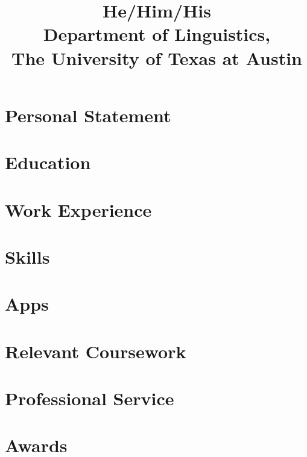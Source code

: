\documentclass[a4paper]{practical-resume}
\title{He/Him/His\\Department of Linguistics,\\The University of Texas at Austin}
\begin{document}
\makecvtitle

\section{Personal Statement}


\section{Education}


\section{Work Experience}


\printbibliography[title=Select Publications]

\section{Skills}


\section{Apps}


\section{Relevant Coursework}


\section{Professional Service}


\section{Awards}

\end{document}
